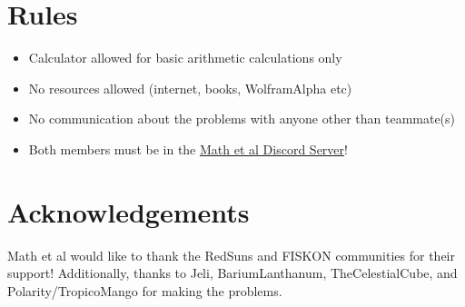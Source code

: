 \section*{\textsf{\textbf{Rules}}}
\begin{itemize}
    \item Calculator allowed for basic arithmetic calculations only
    \item No resources allowed (internet, books, WolframAlpha etc)
    \item No communication about the problems with anyone other than teammate(s)
    \item Both members must be in the \href{https://mathetal.org/discord}{Math et al Discord Server}!
\end{itemize}

\section*{\textsf{\textbf{Acknowledgements}}}
Math et al would like to thank the RedSuns and FISKON communities for their support! Additionally, thanks to Jeli, BariumLanthanum, TheCelestialCube, and Polarity/TropicoMango for making the problems.

\newpage 

\begin{comment}
    {[4 points]} Mango recieved some presents for the anniversary, including an $m$ times $n$ grid, for positive integers $m, n$ that satisfy $4 \mid mn$. The grid comes with a supply of tetrominoes.
        \begin{figure}[!ht]
            \centering
            \texttt{[image: tetrominoes.png]}
            \caption{The seven types of tetrominoes}
        \end{figure}
        \\ Mango tiles the grid using some tetrominoes (possibly rotated) such that:
        \begin {itemize}
        \item Each of the four individual cells in each tetromino overlap perfectly with some cell in the grid
        \item Each cell in the grid is covered by some tetromino
        \item No two tetrominoes overlap
        \end {itemize}
        Prove that the \emph{T} (purple) tetromino is used an even amount of times in the tiling.
\end{comment}



